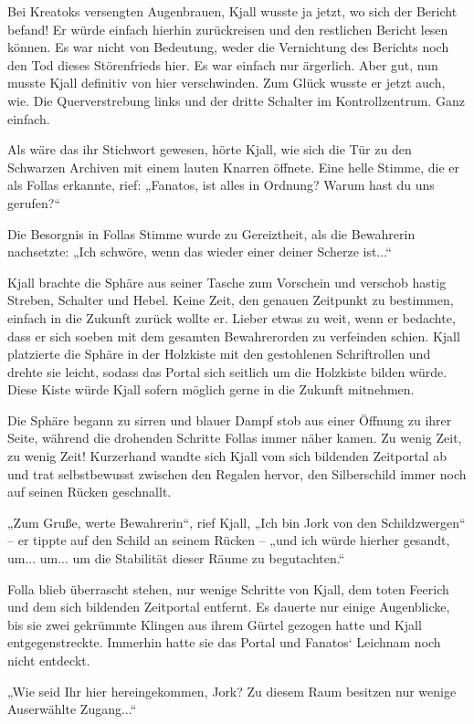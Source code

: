 \documentclass[10pt, a4paper, oneside]{book}
\begin{document}
Bei Kreatoks versengten Augenbrauen, Kjall wusste ja jetzt, wo sich der Bericht befand! Er würde einfach hierhin zurückreisen und den restlichen Bericht lesen können. Es war nicht von Bedeutung, weder die Vernichtung des Berichts noch den Tod dieses Störenfrieds hier. Es war einfach nur ärgerlich. Aber gut, nun musste Kjall definitiv von hier verschwinden. Zum Glück wusste er jetzt auch, wie. Die Querverstrebung links und der dritte Schalter im Kontrollzentrum. Ganz einfach.

Als wäre das ihr Stichwort gewesen, hörte Kjall, wie sich die Tür zu den Schwarzen Archiven mit einem lauten Knarren öffnete. Eine helle Stimme, die er als Follas erkannte, rief: „Fanatos, ist alles in Ordnung? Warum hast du uns gerufen?“

Die Besorgnis in Follas Stimme wurde zu Gereiztheit, als die Bewahrerin nachsetzte: „Ich schwöre, wenn das wieder einer deiner Scherze ist...“

Kjall brachte die Sphäre aus seiner Tasche zum Vorschein und verschob hastig Streben, Schalter und Hebel. Keine Zeit, den genauen Zeitpunkt zu bestimmen, einfach in die Zukunft zurück wollte er. Lieber etwas zu weit, wenn er bedachte, dass er sich soeben mit dem gesamten Bewahrerorden zu verfeinden schien. Kjall platzierte die Sphäre in der Holzkiste mit den gestohlenen Schriftrollen und drehte sie leicht, sodass das Portal sich seitlich um die Holzkiste bilden würde. Diese Kiste würde Kjall sofern möglich gerne in die Zukunft mitnehmen.

Die Sphäre begann zu sirren und blauer Dampf stob aus einer Öffnung zu ihrer Seite, während die drohenden Schritte Follas immer näher kamen. Zu wenig Zeit, zu wenig Zeit! Kurzerhand wandte sich Kjall vom sich bildenden Zeitportal ab und trat selbstbewusst zwischen den Regalen hervor, den Silberschild immer noch auf seinen Rücken geschnallt.

„Zum Gruße, werte Bewahrerin“, rief Kjall, „Ich bin Jork von den Schildzwergen“ – er tippte auf den Schild an seinem Rücken – „und ich würde hierher gesandt, um... um... um die Stabilität dieser Räume zu begutachten.“

Folla blieb überrascht stehen, nur wenige Schritte von Kjall, dem toten Feerich und dem sich bildenden Zeitportal entfernt. Es dauerte nur einige Augenblicke, bis sie zwei gekrümmte Klingen aus ihrem Gürtel gezogen hatte und Kjall entgegenstreckte. Immerhin hatte sie das Portal und Fanatos‘ Leichnam noch nicht entdeckt.

„Wie seid Ihr hier hereingekommen, Jork? Zu diesem Raum besitzen nur wenige Auserwählte Zugang...“
\end{document}
